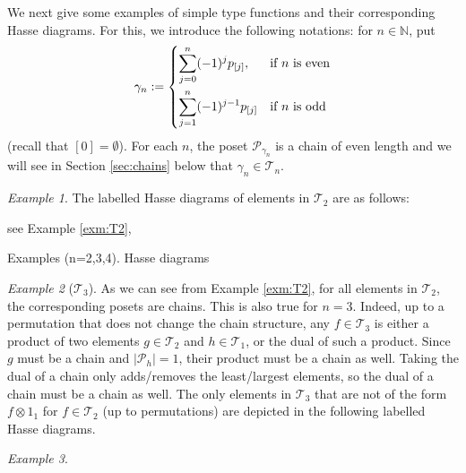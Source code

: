 \documentclass[12pt]{article}
\theoremstyle{definition}
\theoremstyle{remark}
\newtheorem{exm}{Example}
\def\Te{\mathcal T}
\def\Pe{\mathcal P}
\begin{document}
We next give some examples of simple type functions and their corresponding Hasse
diagrams. For this, we introduce the following notations: for $n\in \mathbb N$, put
\begin{equation}\label{eq:gammas}
\gamma_n:= \begin{dcases} \sum_{j=0}^n (-1)^jp_{[j]}, & \text{if $n$ is even}\\
\sum_{j=1}^n (-1)^{j-1}p_{[j]} & \text{if $n$ is odd}
\end{dcases}
\end{equation}
{\color{red} (recall that $[0]=\emptyset$)}. For each $n$, the poset $\Pe_{\gamma_n}$ is a chain of even
length and we will see in Section  \ref{sec:chains} below that $\gamma_n\in \Te_n$. 

\begin{exm} \label{exm:T2hasse} The labelled Hasse diagrams of elements in $\Te_2$ are as
follows:


see Example \ref{exm:T2}, 

\end{exm}

Examples (n=2,3,4). Hasse diagrams
\begin{exm}[$\Te_3$]
As we can see from Example \ref{exm:T2}, for all elements in $\Te_2$, the corresponding
posets are chains. This is
also true for $n=3$. Indeed, up to a permutation that does not change the chain structure, 
any $f\in \Te_3$ is either a product of two elements $g\in \Te_2$ and $h\in \Te_1$,
or the dual of such a  product. Since $g$ must be a chain and $|\Pe_h|=1$, their product
must be a chain as well. Taking the dual of a chain only adds/removes the least/largest
elements, so the dual of a chain must be a chain as well. The only elements in $\Te_3$
that are not of the form $f\otimes 1_1$ for $f\in \Te_2$ (up to permutations) are depicted
in the following labelled Hasse diagrams.
\end{exm}


\begin{exm}\label{exm:T4} 

\end{exm}
\end{document}
